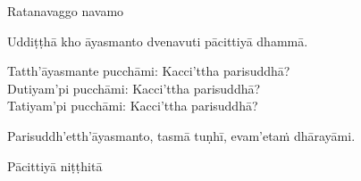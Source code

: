 \begin{center}
  Ratanavaggo navamo
\end{center}

\medskip

\begin{center}
Uddiṭṭhā kho āyasmanto dvenavuti pācittiyā dhammā.

\smallskip

Tatth'āyasmante pucchāmi: Kacci'ttha parisuddhā?\\
Dutiyam'pi pucchāmi: Kacci'ttha parisuddhā?\\
Tatiyam'pi pucchāmi: Kacci'ttha parisuddhā?

\smallskip

Parisuddh'etth'āyasmanto, tasmā tuṇhī, evam'etaṁ dhārayāmi.
\end{center}

\begin{outro}
  Pācittiyā niṭṭhitā
\end{outro}

\clearpage
